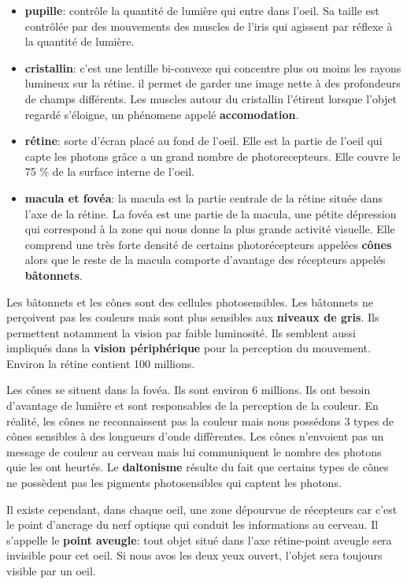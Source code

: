 \begin{itemize}
\item \textbf{pupille}: contr\^ole la quantit\'e de lumi\`ere qui entre dans l'oeil. Sa taille est contr\^ol\'ee par des mouvements des muscles de l'iris qui agissent par r\'eflexe \`a la quantit\'e de lumi\`ere. 
\item \textbf{cristallin}: c'est une lentille bi-convexe qui concentre plus ou moins les rayons lumineux sur la r\'etine. il permet de garder une image nette \`a des profondeurs de champs diff\'erents. Les muscles autour du cristallin l'\'etirent lorsque l'objet regard\'e s'\'eloigne, un ph\'enomene appel\'e \textbf{accomodation}.
\item \textbf{r\'etine}: sorte d'\'ecran plac\'e au fond de l'oeil. Elle est la partie de l'oeil qui capte les photons gr\^ace a un grand nombre de photorecepteurs. Elle couvre le 75 \% de la surface interne de l'oeil.
\item \textbf{macula et fov\'ea}: la macula est la partie centrale de la r\'etine situ\'ee dans l'axe de la r\'etine.  La fov\'ea est une partie de la macula, une p\'etite d\'epression qui correspond \`a la zone qui nous donne la plus grande activit\'e visuelle. Elle comprend une tr\`es forte densit\'e de certains photor\'ecepteurs appel\'ees \textbf{c\^ones} alors que le reste de la macula comporte d'avantage des r\'ecepteurs appel\'es \textbf{b\^atonnets}.
\end{itemize}

Les b\^atonnets et les c\^ones sont des cellules photosensibles. Les b\^atonnets ne per\c{c}oivent pas les couleurs mais sont plus sensibles aux \textbf{niveaux de gris}. Ils permettent notamment la vision par faible luminosit\'e. Ils semblent aussi impliqu\'es dans la \textbf{vision p\'eriph\'erique} pour la perception du mouvement. Environ la r\'etine contient 100 millions.

Les c\^ones se situent dans la fov\'ea. Ils sont environ 6 millions. Ils ont besoin d'avantage de lumi\`ere et sont responsables de la perception de la couleur. En r\'ealit\'e, les c\^ones ne reconnaissent pas la couleur mais nous poss\'edons 3 types de c\^ones sensibles \`a des longueurs d'onde diff\`erentes. Les c\^ones n'envoient pas un message de couleur au cerveau mais lui communiquent le nombre des photons quie les ont heurt\'es. Le \textbf{daltonisme} r\'esulte du fait que certains types de c\^ones ne poss\`edent pas les pigments photosensibles qui captent les photons.

Il existe cependant, dans chaque oeil, une zone d\'epourvue de r\'ecepteurs car c'est le point d'ancrage du nerf optique qui conduit les informations au cerveau. Il s'appelle le \textbf{point aveugle}: tout objet situ\'e dans l'axe r\'etine-point aveugle sera invisible pour cet oeil. Si nous avos les deux yeux ouvert, l'objet sera toujours visible par un oeil. 

